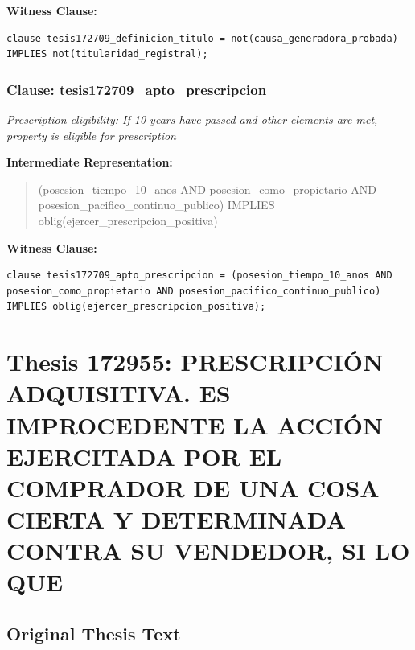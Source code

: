 \documentclass[11pt,a4paper]{article}
\begin{document}
\textbf{Witness Clause:}

\begin{lstlisting}[style=witnessstyle, language=Witness]
clause tesis172709_definicion_titulo = not(causa_generadora_probada) IMPLIES not(titularidad_registral);
\end{lstlisting}

\subsubsection{Clause: tesis172709\_apto\_prescripcion}

\textit{Prescription eligibility: If 10 years have passed and other elements are met, property is eligible for prescription}

\textbf{Intermediate Representation:}

\begin{quote}
(posesion\_tiempo\_10\_anos AND posesion\_como\_propietario AND posesion\_pacifico\_continuo\_publico) IMPLIES oblig(ejercer\_prescripcion\_positiva)
\end{quote}

\textbf{Witness Clause:}

\begin{lstlisting}[style=witnessstyle, language=Witness]
clause tesis172709_apto_prescripcion = (posesion_tiempo_10_anos AND posesion_como_propietario AND posesion_pacifico_continuo_publico) IMPLIES oblig(ejercer_prescripcion_positiva);
\end{lstlisting}

\newpage

\section{Thesis 172955: PRESCRIPCIÓN ADQUISITIVA. ES IMPROCEDENTE LA ACCIÓN EJERCITADA POR EL COMPRADOR DE UNA COSA CIERTA Y DETERMINADA CONTRA SU VENDEDOR, SI LO QUE}
\label{thesis:172955}

\subsection{Original Thesis Text}
\end{document}
